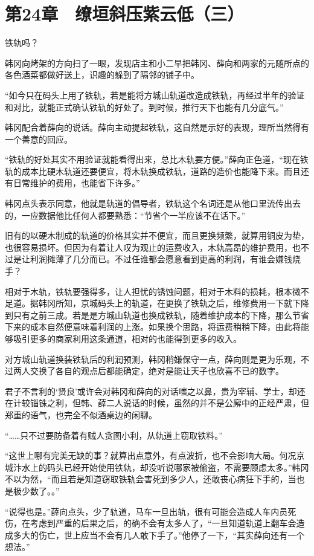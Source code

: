 \section{第24章　缭垣斜压紫云低（三）}

铁轨吗？ 

韩冈向烤架的方向扫了一眼，发现店主和小二早把韩冈、薛向和两家的元随所点的各色酒菜都做好送上，识趣的躲到了隔邻的铺子中。 

“如今只在码头上用了铁轨，若是能将方城山轨道改造成铁轨，再经过半年的验证和对比，就能正式确认铁轨的好处了。到时候，推行天下也能有几分底气。” 

韩冈配合着薛向的说话。薛向主动提起铁轨，这自然是示好的表现，理所当然得有一个善意的回应。 

“铁轨的好处其实不用验证就能看得出来，总比木轨要方便。”薛向正色道，“现在铁轨的成本比硬木轨道还要便宜，将木轨换成铁轨，道路的造价也能降下来。而且还有日常维护的费用，也能省下许多。” 

韩冈点头表示同意，他就是轨道的倡导者，铁轨这个名词还是从他口里流传出去的，一应数据他比任何人都要熟悉：“节省个一半应该不在话下。” 

旧有的以硬木制成的轨道的价格其实并不便宜，而且更换频繁，就算用铜皮为垫，也很容易损坏。但因为有着让人叹为观止的运费收入，木轨高昂的维护费用，也不过是让利润摊薄了几分而已。不过任谁都会愿意看到更高的利润，有谁会嫌钱烧手？ 

相对于木轨，铁轨要强得多，让人担忧的锈蚀问题，相对于木料的损耗，根本微不足道。据韩冈所知，京城码头上的轨道，在更换了铁轨之后，维修费用一下就下降到只有之前三成。若是是方城山轨道也换成铁轨，随着维护成本的下降，那么节省下来的成本自然便意味着利润的上涨。如果换个思路，将运费稍稍下降，由此将能够吸引更多的商家利用这条通道，相对的也能得到更多的收入。 

对方城山轨道换装铁轨后的利润预测，韩冈稍嫌保守一点，薛向则是更为乐观，不过两人交换了各自的观点后都能确定，绝对是能让天子也欣喜不已的数字。 

君子不言利的‘贤良’或许会对韩冈和薛向的对话嗤之以鼻，贵为宰辅、学士，却还在计较锱铢之利，但韩、薛二人说话的时候，虽然的并不是公廨中的正经严肃，但郑重的语气，也完全不似酒桌边的闲聊。 

“……只不过要防备着有贼人贪图小利，从轨道上窃取铁料。” 

“这世上哪有完美无缺的事？就算出点意外，有点波折，也不会影响大局。何况京城汴水上的码头已经开始使用铁轨，却没听说哪家被偷盗，不需要顾虑太多。”韩冈不以为然，“而且若是知道窃取铁轨会害死到多少人，还敢丧心病狂下手的，当也是极少数了。。” 

“说得也是。”薛向点头，少了轨道，马车一旦出轨，很有可能会造成人车内员死伤，在考虑到严重的后果之后，的确不会有太多人了，“一旦知道轨道上翻车会造成多大的伤亡，世上应当不会有几人敢下手了。”他停了一下，“其实薛向还有一个想法。” 

